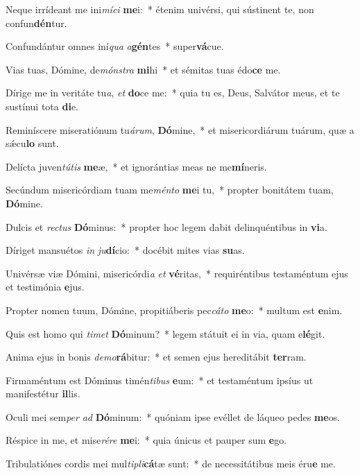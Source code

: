 \item Neque irrídeant me ini\textit{mí}\textit{ci} \textbf{me}i:~* étenim univérsi, qui sústinent te, non confun\textbf{dén}tur.
\item Confundántur omnes iní\textit{qua} \textit{a}\textbf{gén}tes~* super\textbf{vá}cue.
\item Vias tuas, Dómine, de\textit{móns}\textit{tra} \textbf{mi}hi~* et sémitas tuas édo\textbf{ce} me.
\item Dírige me in veritáte tu\textit{a}, \textit{et} \textbf{do}ce me:~* quia tu es, Deus, Salvátor meus, et te sustínui tota \textbf{di}e.
\item Reminíscere miseratiónum tu\textit{á}\textit{rum}, \textbf{Dó}mine,~* et misericordiárum tuárum, quæ a sǽcu\textbf{lo} sunt.
\item Delícta juven\textit{tú}\textit{tis} \textbf{me}æ,~* et ignorántias meas ne me\textbf{mí}neris.
\item Secúndum misericórdiam tuam me\textit{mén}\textit{to} \textbf{me}i tu,~* propter bonitátem tuam, \textbf{Dó}mine.
\item Dulcis et \textit{rec}\textit{tus} \textbf{Dó}minus:~* propter hoc legem dabit delinquéntibus in \textbf{vi}a.
\item Díriget mansuétos \textit{in} \textit{ju}\textbf{dí}cio:~* docébit mites vias \textbf{su}as.
\item Univérsæ viæ Dómini, misericórdi\textit{a} \textit{et} \textbf{vé}ritas,~* requiréntibus testaméntum ejus et testimónia \textbf{e}jus.
\item Propter nomen tuum, Dómine, propitiáberis pec\textit{cá}\textit{to} \textbf{me}o:~* multum est \textbf{e}nim.
\item Quis est homo qui \textit{ti}\textit{met} \textbf{Dó}minum?~* legem státuit ei in via, quam e\textbf{lé}git.
\item Anima ejus in bonis \textit{de}\textit{mo}\textbf{rá}bitur:~* et semen ejus hereditábit \textbf{ter}ram.
\item Firmaméntum est Dóminus timén\textit{ti}\textit{bus} \textbf{e}um:~* et testaméntum ipsíus ut manifestétur \textbf{il}lis.
\item Oculi mei sem\textit{per} \textit{ad} \textbf{Dó}minum:~* quóniam ipse evéllet de láqueo pedes \textbf{me}os.
\item Réspice in me, et mise\textit{ré}\textit{re} \textbf{me}i:~* quia únicus et pauper sum \textbf{e}go.
\item Tribulatiónes cordis mei mul\textit{ti}\textit{pli}\textbf{cá}tæ sunt:~* de necessitátibus meis éru\textbf{e} me.
